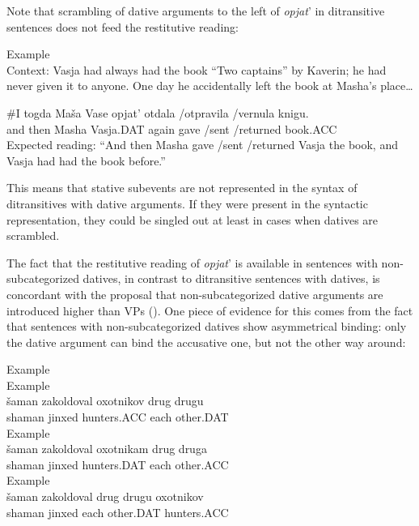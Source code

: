 \documentclass[output=paper,modfonts,nonflat,
 hidelinks
]{langsci/langscibook}
\begin{document}
Note that scrambling of dative arguments to the left of \textit{opjat}’ in ditransitive sentences does not feed the restitutive reading:


 \ea\label{ex:bondarenko:}
{Example}\\

Context: Vasja had always had the book “Two captains” by Kaverin; he had never given it to anyone. One day he accidentally left the book at Masha’s place…

\gll \#I togda Maša Vase opjat’ otdala /otpravila /vernula knigu.\\
     and then Masha Vasja.DAT again gave /sent /returned book.ACC\\
\glt Expected reading: “And then Masha gave /sent /returned Vasja the book, and Vasja had had the book before.”
\z

This means that stative subevents are not represented in the syntax of ditransitives with dative arguments. If they were present in the syntactic representation, they could be singled out at least in cases when datives are scrambled.



The fact that the restitutive reading of \textit{opjat}’ is available in sentences with non-subcategorized datives, in contrast to ditransitive sentences with datives, is concordant with the proposal that non-subcategorized dative arguments are introduced higher than VPs (\citealt{BonehNash2017}). One piece of evidence for this comes from the fact that sentences with non-subcategorized datives show asymmetrical binding: only the dative argument can bind the accusative one, but not the other way around:


 \ea\label{ex:bondarenko:}
{Example}\\

\ea Example\\
\gll *šaman zakoldoval oxotnikov drug drugu\\
  shaman jinxed hunters.ACC each other.DAT\\

\ex Example\\
\gll šaman zakoldoval oxotnikam drug druga\\
  shaman jinxed hunters.DAT each other.ACC\\

\ex Example\\
\gll *šaman zakoldoval drug drugu  oxotnikov\\
  shaman jinxed each other.DAT hunters.ACC\\
\end{document}

